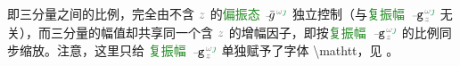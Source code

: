 即三分量之间的比例，完全由不含 $\mathcolor{gray}{z}$ 的\textcolor{ForestGreen}{偏振态} $\Xint{{}^{}_{\mathcolor{gray}{-}}}{10}{\bar{g}}^{\;\!\mathcolor{gray}{\omega} \textcolor{ForestGreen}{\jmath}}$ 独立控制（与\textcolor{ForestGreen}{复振幅} $\Xint{\begin{smallmatrix} ~ \\ {}^{}_{\mathcolor{gray}{-}} \\ ~ \end{smallmatrix}}{09}{\mathtt{g}}^{\;\!\mathcolor{gray}{\omega} \textcolor{ForestGreen}{\jmath}}_{\;\! \mathcolor{gray}{z}}$ 无关），而三分量的幅值却共享同一个含 $\mathcolor{gray}{z}$ 的增幅因子，即按\textcolor{ForestGreen}{复振幅} $\Xint{\begin{smallmatrix} ~ \\ {}^{}_{\mathcolor{gray}{-}} \\ ~ \end{smallmatrix}}{09}{\mathtt{g}}^{\;\!\mathcolor{gray}{\omega} \textcolor{ForestGreen}{\jmath}}_{\;\! \mathcolor{gray}{z}}$ 的比例同步缩放。注意，这里只给 \textcolor{ForestGreen}{复振幅} $\Xint{\begin{smallmatrix} ~ \\ {}^{}_{\mathcolor{gray}{-}} \\ ~ \end{smallmatrix}}{09}{\mathtt{g}}^{\;\!\mathcolor{gray}{\omega} \textcolor{ForestGreen}{\jmath}}_{\;\! \mathcolor{gray}{z}}$ 单独赋予了字体 \textbackslash mathtt，见 。


